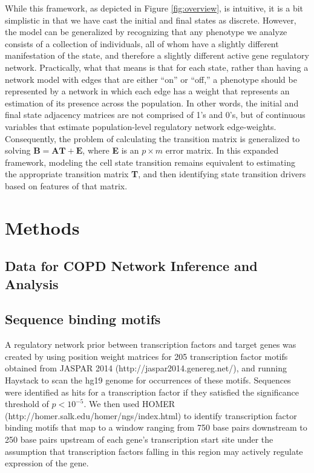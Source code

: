 While this framework, as depicted in Figure \ref{fig:overview}, is intuitive, it is a bit simplistic in that we have cast the initial and final states as discrete. However, the model can be generalized by recognizing that any phenotype we analyze consists of a collection of individuals, all of whom have a slightly different manifestation of the state, and therefore a slightly different active gene regulatory network. Practically, what that means is that for each state, rather than having a network model with edges that are either ``on'' or ``off,'' a phenotype should be represented by a network in which each edge has a weight that represents an estimation of its presence across the population. In other words, the initial and final state adjacency matrices are not comprised of 1's and 0's, but of continuous variables that estimate population-level regulatory network edge-weights. Consequently, the problem of calculating the transition matrix is generalized to solving $\mathbf{B}=\mathbf{A}\mathbf{T}+\mathbf{E}$, where \textbf{E} is an $p\times m$ error matrix. In this expanded framework, modeling the cell state transition remains equivalent to estimating the appropriate transition matrix \textbf{T}, and then identifying state transition drivers based on features of that matrix.  

\section{Methods}
\subsection*{Data for COPD Network Inference and Analysis}
\subsection*{Sequence binding motifs}
A regulatory network prior between transcription factors and target genes was created by using position weight matrices for 205 transcription factor motifs obtained from JASPAR 2014 (http://jaspar2014.genereg.net/), \cite{mathelier2013jaspar} and running Haystack\cite{pinello2014analysis} to scan the hg19 genome for occurrences of these motifs. Sequences were identified as hits for a transcription factor if they satisfied the significance threshold of $p<10^{-5}$. We then used HOMER (http://homer.salk.edu/homer/ngs/index.html) \cite{heinz2010simple} to identify transcription factor binding motifs that map to a window ranging from 750 base pairs downstream to 250 base pairs upstream of each gene's transcription start site under the assumption that transcription factors falling in this region may actively regulate expression of the gene.

